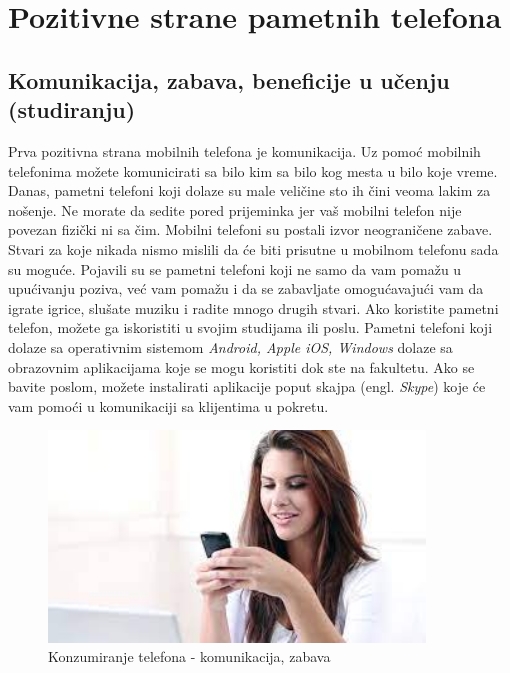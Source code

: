 \documentclass[a4paper]{article}
\begin{document}
\newpage
\section{Pozitivne strane pametnih telefona}

\subsection{Komunikacija, zabava, beneficije u učenju (studiranju)}
Prva pozitivna strana mobilnih telefona je komunikacija. Uz pomoć mobilnih telefonima
možete komunicirati sa bilo kim sa bilo kog mesta u bilo koje vreme.
Danas, pametni telefoni koji dolaze su male veličine sto ih čini veoma lakim za
nošenje. Ne morate da sedite pored prijeminka jer vaš mobilni telefon nije
povezan fizički ni sa čim.
\newline
\newline
Mobilni telefoni su postali izvor neograničene zabave.
Stvari za koje nikada nismo mislili da će biti prisutne u mobilnom telefonu
sada su moguće. Pojavili su se pametni telefoni koji ne samo da vam pomažu
u upućivanju poziva, već vam pomažu i da se zabavljate omogućavajući
vam da igrate igrice, slušate muziku i radite mnogo drugih stvari.
\newline
\newline
Ako koristite pametni telefon, možete ga iskoristiti u svojim studijama ili poslu.
Pametni telefoni koji dolaze sa operativnim sistemom \textit{Android, Apple iOS, Windows}
dolaze sa obrazovnim aplikacijama koje se mogu koristiti dok ste na fakultetu.
Ako se bavite poslom, možete instalirati aplikacije
poput skajpa (engl. \textit{Skype}) koje će vam pomoći u komunikaciji sa klijentima u
pokretu.


\begin{figure}[h!]
\centering
\begin{center}
\includegraphics[width=100mm]{image1.jpeg}
\end{center}
\caption{Konzumiranje telefona - komunikacija, zabava}
\label{fig:vr}
\end{figure}
\end{document}
